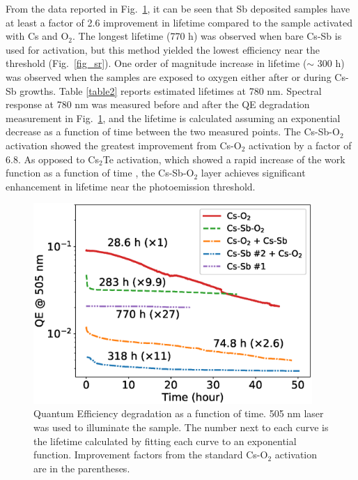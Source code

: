 From the data reported in Fig.~\ref{fig_lifetime}, it can be seen that Sb deposited samples have at least a factor of 2.6 improvement in lifetime compared to the sample activated with Cs and O$_2$. The longest lifetime (770 h) was observed when bare Cs-Sb is used for activation, but this method yielded the lowest efficiency near the threshold (Fig.~\ref{fig_sr}).
One order of magnitude increase in lifetime ($\sim$ 300 h) was observed when the samples are exposed to oxygen either after or during Cs-Sb growths.  
Table \ref{table2} reports estimated lifetimes at 780 nm.
Spectral response at 780 nm was measured before and after the QE degradation measurement in Fig.~\ref{fig_lifetime}, and the lifetime is calculated assuming an exponential decrease as a function of time between the two measured points. The Cs-Sb-O$_2$ activation showed the greatest improvement from Cs-O$_2$ activation by a factor of 6.8.
As opposed to Cs$_2$Te activation, which showed a rapid increase of the work function as a function of time \cite{sugiyama2011_StudyElectronAffinity}, the Cs-Sb-O$_2$ layer achieves significant enhancement in lifetime near the photoemission threshold.



\begin{figure}
	\centering
	\includegraphics*[width=300pt]{figs/CsSbO/lifetime.eps}
	\caption{Quantum Efficiency degradation as a function of time. 505 nm laser was used to illuminate the sample. The number next to each curve is the lifetime calculated by fitting each curve to an exponential function. Improvement factors from the standard Cs-O$_2$ activation are in the parentheses.}
	\label{fig_lifetime}
\end{figure}



